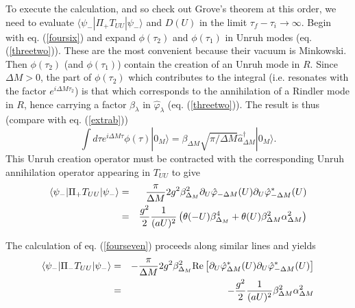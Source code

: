 \documentclass[12pt,oneside]{report}
\def\ket#1{|#1\rangle}
\def\elematrice#1#2#3{\langle #1|#2|#3 \rangle}
\def\la{\lambda}
\begin{document}
To execute the calculation, and so check out 
Grove's theorem at this order, we need to evaluate 
$\elematrice{\psi_-} {\Pi_+ T_{UU} }{\psi_-}$  and $D(U)$ in the limit
$\tau_f - \tau_i \to \infty$. Begin with
 eq. (\ref{foursix}) and expand $\phi(\tau_2)$ and $\phi(\tau_1)$ in Unruh modes
(eq. (\ref{threetwo})). These are the most convenient because their vacuum
is Minkowski. Then
$\phi(\tau_2)$ (and $\phi(\tau_1)$) contain the creation of an Unruh mode in
$R$. Since $\Delta M >0$, the part of $\phi(\tau_2)$ which contributes to the
integral (i.e. resonates with the factor $e^{i \Delta M \tau_2}$) is that which
corresponds to the annihilation of a Rindler mode in $R$, hence carrying a
factor $\beta_\la$ in $\hat \varphi_\la$ (eq. (\ref{threetwo})). The result is
thus (compare with eq. (\ref{extrab}))
\begin{equation}
\int d\tau e^{i\Delta M \tau } \phi (\tau)\ket{0_M} = \beta_{\Delta M}
 \sqrt{\pi/\Delta
M} \hat a^\dagger_{\Delta M} \ket{0_M}. 
\end{equation}
This Unruh creation operator must
be contracted with the corresponding Unruh annihilation operator appearing in
$T_{UU}$ to give
\begin{eqnarray} \elematrice{\psi_-}
{\Pi_+ T_{UU} }{\psi_-} &=& {\pi \over \Delta M} 2 g^2\beta_{\Delta_M}^2
\partial_{U} \hat \varphi_{-\Delta M}(U)
\partial_{U} \hat \varphi_{-\Delta M}^*(U)
\nonumber\\
&=& {g^2   \over 2} {1 \over (aU)^2}\left(\theta(-U) 
\beta_{\Delta_M}^4 +\theta(U)  \beta_{\Delta M}^2\alpha_{\Delta M}^2 
\right)
\label{fourninea} \end{eqnarray}

The calculation of  eq. (\ref{fourseven}) proceeds along similar lines and yields
\begin{eqnarray}
\elematrice{\psi_-} {\Pi_- T_{UU} }{\psi_-}&=& -
{\pi \over \Delta M} 2 g^2\beta_{\Delta_M}^2 {\rm Re} \left[
\partial_{U} \hat \varphi_{\Delta M}^*(U)
\partial_{U} \hat \varphi_{-\Delta M}^*(U)\right]
\nonumber\\
&=& 
-{g^2   \over 2} {1 \over (aU)^2}
 \beta_{\Delta M}^2\alpha_{\Delta M}^2 
\label{fournineb}
\end{eqnarray}
\end{document}
